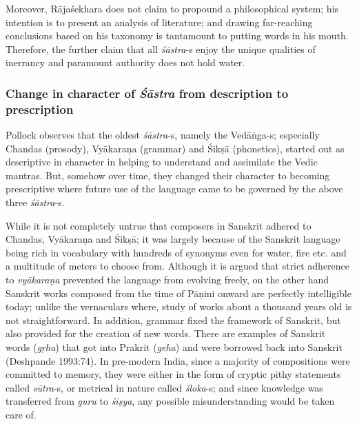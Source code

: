 Moreover, Rājaśekhara does not claim to propound a philosophical system; his intention is to present an analysis of literature; and drawing far-reaching conclusions based on his taxonomy is tantamount to putting words in his mouth. Therefore, the further claim that all {\sl śāstra}-s enjoy the unique qualities of inerrancy and paramount authority does not hold water.\\[-20pt]

\subsubsection{Change in character of {{\sl\bfseries Śāstra}\relax} from description to prescription}\label{art12-sec3.4.1}

\vskip -5pt

Pollock observes that the oldest {\sl śāstra}-s, namely the \hbox{Vedāṅga-s}; especially Chandas (prosody), Vyākaraṇa (grammar) and Śikṣā (phonetics), started out as descriptive in character in helping to understand and assimilate the Vedic mantras. But, somehow over time, they changed their character to becoming prescriptive where future use of the language came to be governed by the above three {\sl śāstra}-s.

While it is not completely untrue that composers in Sanskrit adhered to Chandas, Vyākaraṇa and Śikṣā; it was largely because of the Sanskrit language being rich in vocabulary with hundreds of synonyms even for water, ﬁre etc. and a multitude of meters to choose from. Although it is argued that strict adherence to {\sl vyākaraṇa} prevented the language from evolving freely, on the other hand Sanskrit works composed from the time of Pāṇini onward are perfectly intelligible today; unlike the vernaculars where, study of works about a thousand years old is not straightforward. In addition, grammar ﬁxed the framework of Sanskrit, but also provided for the creation of new words. There are examples of Sanskrit words ({\sl gṛha}) that got into Prakrit ({\sl geha}) and were borrowed back into Sanskrit (Deshpande 1993:74). In pre-modern India, since a majority of compositions were committed to memory, they were either in the form of cryptic pithy statements called {\sl sūtra}-s, or metrical in nature called {\sl śloka}-s; and since knowledge was transferred from {\sl guru} to {\sl śiṣya}, any possible misunderstanding would be taken care of.\\[-22pt]

